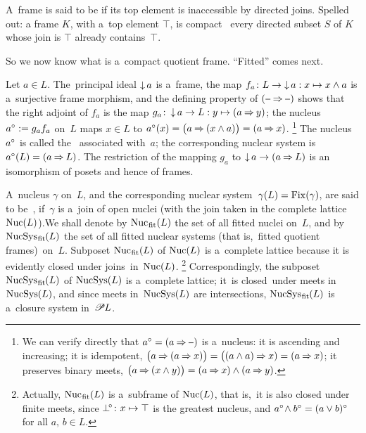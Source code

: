 \documentclass[11pt,letterpaper]{article}
\begin{document}
\txtskip

A~frame is said to be  if its top element is inaccessible by directed joins.
Spelled out: a frame $K$, with a~top element $\top$, is compact
\iff\ every directed subset $S$ of $K$ whose join is $\top$ already contains~$\top$.

\txtskip

So we now know what is a~compact quotient frame.
``Fitted'' comes next.

\txtskip

Let $a\in L$.
The~principal ideal $\mathop{\smash{\downarrow}}\nolimits a$ is a~frame,
the map $f_a\colon L\to\mathop{\smash{\downarrow}}\nolimits a : x\mapsto x\wedge a$ is a~surjective frame morphism,
and the defining property of $(\anon\bimpl\anon)$ shows that
the right adjoint of $f_a$ is the map $g_a\colon \mathop{\smash{\downarrow}}\nolimits a\to L : y \mapsto (a\mathbin{\Rightarrow} y)$;
the nucleus $a{}^\circ := g_a f_a$ on~$L$
maps $x\in L$ to $a{}^\circ(x) = \bigl(a\mathbin{\Rightarrow}(x\wedge a)\bigr) = (a\mathbin{\Rightarrow} x)$.%
%
\footnote{We can verify directly that $a\open = (a\bimpl\anon)$ is a~nucleus:
it is ascending and increasing;
it is idempotent, $\bigl(a\mathbin{\Rightarrow}(a\mathbin{\Rightarrow} x)\bigr) = \bigl((a\wedge a)\mathbin{\Rightarrow} x) = (a\mathbin{\Rightarrow} x)$;
it preserves binary meets, $\bigl(a\mathbin{\Rightarrow}(x\wedge y)\bigr) = (a\mathbin{\Rightarrow} x)\wedge(a\mathbin{\Rightarrow} y)$.}
%
The nucleus $a{}^\circ$ is called the~ associated with~$a$;
the corresponding nuclear system is $a{}^\circ(L)=(a\mathbin{\Rightarrow} L)$.
The restriction of the mapping $g_a$ to $\mathop{\smash{\downarrow}}\nolimits a\to(a\mathbin{\Rightarrow} L)$
is an isomorphism of posets and hence of frames.

A~nucleus $\gamma$ on~$L$,
	and the corresponding nuclear system~$\gamma(L)=\mathop{\smash{\mathrm{Fix}}}\nolimits(\gamma)$, %
are said to be~,
if~$\gamma$ is a~join of open nuclei
	{\large(}with the join taken in the complete lattice~$\mathop{\smash{\mathrm{Nuc}}}\nolimits(L)${\large)}.\linebreak[3]
We shall denote by $\mathop{\smash{\mathrm{Nuc}}}\nolimits_{\mspace{1mu}\mathrm{fit}\mspace{-1mu}}\mspace{1mu}(L)$ the set of all fitted nuclei on~$L$,
and by $\mathop{\smash{\mathrm{NucSys}}}\nolimits_{\mspace{1mu}\mathrm{fit}\mspace{-1mu}}(L)$ the set of all fitted nuclear systems
(that is,~fitted quotient frames)~on~$L$.
Subposet $\mathop{\smash{\mathrm{Nuc}}}\nolimits_{\mspace{1mu}\mathrm{fit}\mspace{-1mu}}\mspace{1mu}(L)$ of $\mathop{\smash{\mathrm{Nuc}}}\nolimits(L)$ is a~complete lattice
because it is evidently closed under joins~in~$\mathop{\smash{\mathrm{Nuc}}}\nolimits(L)$.%
%
\footnote{Actually, $\mathop{\smash{\mathrm{Nuc}}}\nolimits_{\mspace{1mu}\mathrm{fit}\mspace{-1mu}}\mspace{1mu}(L)$ is a~subframe of $\mathop{\smash{\mathrm{Nuc}}}\nolimits(L)$,
that is,~it is also closed under finite meets,
since $\bot\!{}^\circ\colon x\mapsto\top$ is the greatest nucleus,
and $a{}^\circ\!\wedge b{}^\circ = (a\vee b){}^\circ$ for all $a,\,b\in L$.}\linebreak[3]
%
Correspondingly, the subposet $\mathop{\smash{\mathrm{NucSys}}}\nolimits_{\mspace{1mu}\mathrm{fit}\mspace{-1mu}}(L)$ of $\mathop{\smash{\mathrm{NucSys}}}\nolimits(L)$ is a~complete lattice;
it~is closed~under meets in~$\mathop{\smash{\mathrm{NucSys}}}\nolimits(L)$,
and since meets in~$\mathop{\smash{\mathrm{NucSys}}}\nolimits(L)$ are intersections,
$\mathop{\smash{\mathrm{NucSys}}}\nolimits_{\mspace{1mu}\mathrm{fit}\mspace{-1mu}}(L)$ is a~closure system in~$\mathscr{P}{\mspace{-1mu} L}$.
\end{document}
